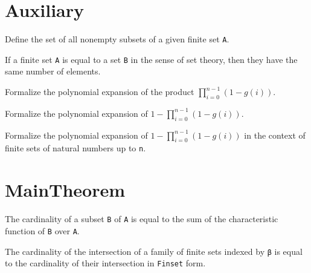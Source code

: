 \section{Auxiliary}

\begin{definition}\label{Finset.powerset₀}
  \leanok
  Define the set of all nonempty subsets of a given finite set \verb|A|.
\end{definition}

\begin{lemma}\label{card_eq}
  If a finite set \verb|A| is equal to a set \verb|B| in the sense of set theory, then they have the same number of elements.
\end{lemma}

\begin{lemma}\label{mul_expand₃}
  Formalize the polynomial expansion of the product \(\prod_{i=0}^{n-1} (1 - g(i))\).
\end{lemma}

\begin{lemma}\label{mul_expand₂}
  Formalize the polynomial expansion of \(1 - \prod_{i=0}^{n-1} (1 - g(i))\).
\end{lemma}

\begin{lemma}\label{mul_expand₁}
  Formalize the polynomial expansion of \(1 - \prod_{i=0}^{n-1} (1 - g(i))\) in the context of finite sets of natural numbers up to \verb|n|.
\end{lemma}


\section{MainTheorem}

\begin{lemma}\label{card_eq_sum_char_fun}
  The cardinality of a subset \verb|B| of \verb|A| is equal to the sum of the characteristic function of \verb|B| over \verb|A|.
\end{lemma}

\begin{lemma}\label{card_eq_FinInter}
  The cardinality of the intersection of a family of finite sets indexed by \verb|β| is equal to the cardinality of their intersection in \verb|Finset| form.
\end{lemma}

